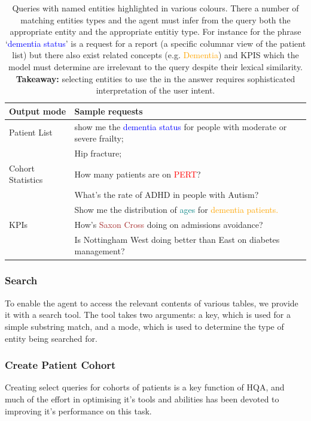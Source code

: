 \documentclass[11pt]{article}
\begin{document}
\begin{table}[t]
\centering
\begin{tabular}{|p{2cm}|p{5cm}|}
\hline
	Output mode & Sample requests \\
\hline
\hline
	Patient List	& show me the \textcolor{blue}{dementia status} for people with moderate or severe frailty; \\
			& Hip fracture; \\ 
\hline
	Cohort Statistics 	& How many patients are on \textcolor{red}{PERT}? \\
				& What's the rate of ADHD in people with Autism? \\
				& Show me the distribution of \textcolor{teal}{ages} for \textcolor{orange}{dementia patients.} \\
\hline
	KPIs 	& How's \textcolor{brown}{Saxon Cross} doing on admissions avoidance? \\
		& Is Nottingham West doing better than East on diabetes management? \\	
\hline
\end{tabular}
\caption{
	Queries with named entities highlighted in various colours.
	There a number of matching entities types and the agent must infer from the query both the appropriate entity and the appropriate entitiy type.
	For instance for the phrase `\textcolor{blue}{dementia status}' is a request for a report (a specific columnar view of the patient list) but there also exist related
	concepts (e.g. \textcolor{orange}{Dementia}) and KPIS which the model must determine are irrelevant to the query despite their lexical similarity.
	\\ \textbf{Takeaway:} selecting entities to use the in the answer requires sophisticated interpretation of the user intent.  
}
\label{tab:sample-queries}
\end{table}

\subsubsection{Search}
To enable the agent to access the relevant contents of various tables, we provide it with a search tool.
The tool takes two arguments: a key, which is used for a simple substring match, and a mode, which is used to determine the type of entity being searched
for.

\subsubsection{Create Patient Cohort}
Creating select queries for cohorts of patients is a key function of HQA, and much of the effort in optimising it's tools and abilities has been devoted to improving it's performance on this task.
\end{document}
